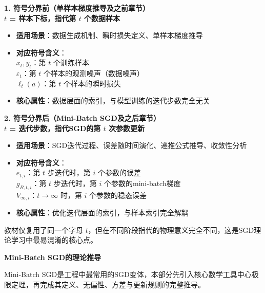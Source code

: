\documentclass[10pt]{article}
\numberwithin{equation}{section}
\theoremstyle{plain}
\theoremstyle{definition}
\theoremstyle{remark}
\begin{document}
\textbf{1. 符号分界前（单样本梯度推导及之前章节）}\\
\textbf{$t$ = 样本下标，指代第 $t$ 个数据样本}
\begin{itemize}[leftmargin=*,nosep]
    \item \textbf{适用场景}：数据生成机制、瞬时损失定义、单样本梯度推导
    \item \textbf{对应符号含义}：\\
        $x_t, y_t$：第 $t$ 个训练样本\\
        $\varepsilon_t$：第 $t$ 个样本的观测噪声（数据噪声）\\
        $\ell_t(a)$：第 $t$ 个样本的瞬时损失
    \item \textbf{核心属性}：数据层面的索引，与模型训练的迭代步数完全无关
\end{itemize}

\textbf{2. 符号分界后（Mini-Batch SGD及之后章节）}\\
\textbf{$t$ = 迭代步数，指代SGD的第 $t$ 次参数更新}
\begin{itemize}[leftmargin=*,nosep]
    \item \textbf{适用场景}：SGD迭代过程、误差随时间演化、递推公式推导、收敛性分析
    \item \textbf{对应符号含义}：\\
        $e_{t,i}$：第 $t$ 步迭代时，第 $i$ 个参数的误差\\
        $g_{B,t,i}$：第 $t$ 步迭代时，第 $i$ 个参数的mini-batch梯度\\
        $V_{\infty,i}$：$t \to \infty$ 时，第 $i$ 个参数的稳态误差
    \item \textbf{核心属性}：优化迭代层面的索引，与样本索引完全解耦
\end{itemize}

教材仅复用了同一个字母 $t$，但在不同阶段指代的物理意义完全不同，这是SGD理论学习中最易混淆的核心点。

{\par\vspace{1ex}\noindent\large\bfseries\color{brandD} Mini-Batch SGD的理论推导\par}\par\vspace{0.5ex}
Mini-Batch SGD是工程中最常用的SGD变体，本部分先引入核心数学工具中心极限定理，再完成其定义、无偏性、方差与更新规则的完整推导。
\end{document}
